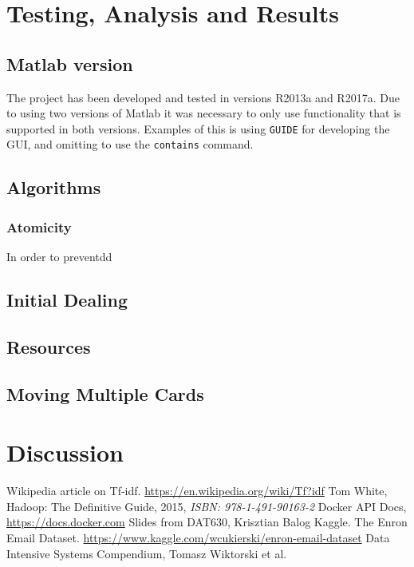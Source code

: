 \documentclass[runningheads,a4paper]{llncs}
\begin{document}
\section{Testing, Analysis and Results}
\subsection{Matlab version}
The project has been developed and tested in versions R2013a and R2017a. Due to using two versions of Matlab it was necessary to only use functionality that is supported in both versions. Examples of this is using \verb!GUIDE! for developing the GUI, and omitting to use the \verb!contains! command.
\label{sec:3_testing_analysis}
\subsection{Algorithms}
\subsubsection{Atomicity}
In order to preventdd
\subsection{Initial Dealing}
\label{sec:3_initial_dealing}
\subsection{Resources}
\subsection{Moving Multiple Cards}

\section{Discussion}



\begin{thebibliography}{6}

 Wikipedia article on Tf-idf. \url{https://en.wikipedia.org/wiki/Tf?idf}
 Tom White, Hadoop: The Definitive Guide, 2015, \emph{ISBN: 978-1-491-90163-2}
 Docker API Docs, \url{https://docs.docker.com}
 Slides from DAT630, Krisztian Balog
 Kaggle. The Enron Email Dataset. \url{https://www.kaggle.com/wcukierski/enron-email-dataset}
 Data Intensive Systems Compendium, Tomasz Wiktorski et al.

\end{thebibliography}
\appendix
\end{document}
